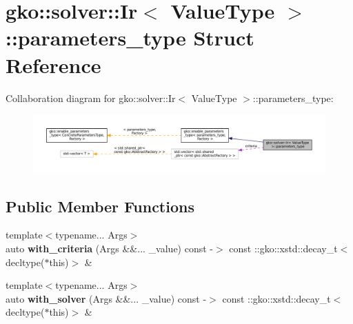 \hypertarget{structgko_1_1solver_1_1Ir_1_1parameters__type}{}\section{gko\+:\+:solver\+:\+:Ir$<$ Value\+Type $>$\+:\+:parameters\+\_\+type Struct Reference}
\label{structgko_1_1solver_1_1Ir_1_1parameters__type}


Collaboration diagram for gko\+:\+:solver\+:\+:Ir$<$ Value\+Type $>$\+:\+:parameters\+\_\+type\+:
\nopagebreak
\begin{figure}[H]
\begin{center}
\leavevmode
\includegraphics[width=350pt]{structgko_1_1solver_1_1Ir_1_1parameters__type__coll__graph}
\end{center}
\end{figure}
\subsection*{Public Member Functions}
\begin{DoxyCompactItemize}
\item 
\mbox{\label{structgko_1_1solver_1_1Ir_1_1parameters__type_a42a2934f967d00043b9cdc63c7d0f9f8}} 
{\footnotesize template$<$typename... Args$>$ }\\auto {\bfseries with\+\_\+criteria} (Args \&\&... \+\_\+value) const -\/$>$ const \+::gko\+::xstd\+::decay\+\_\+t$<$ decltype($\ast$this)$>$ \&
\item 
\mbox{\label{structgko_1_1solver_1_1Ir_1_1parameters__type_ab5c976205734807c9e1ef6755ad0a76e}} 
{\footnotesize template$<$typename... Args$>$ }\\auto {\bfseries with\+\_\+solver} (Args \&\&... \+\_\+value) const -\/$>$ const \+::gko\+::xstd\+::decay\+\_\+t$<$ decltype($\ast$this)$>$ \&
\end{DoxyCompactItemize}
